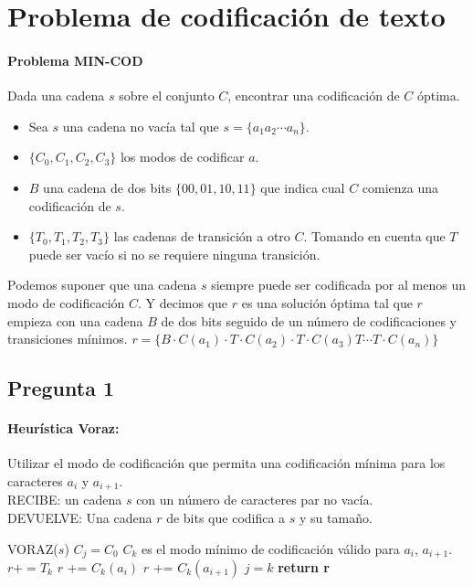 \section{Problema de codificación de texto}

\paragraph{Problema MIN-COD}
Dada una cadena $s$ sobre el conjunto $C$, encontrar una codificación de $C$ óptima.

\begin{itemize}
    \item Sea $s$ una cadena no vacía tal que $s = \{a_1a_2\cdots a_n\}$. 
    \item $\{C_0, C_1, C_2, C_3\}$ los modos de codificar $a$.
    \item $B$ una cadena de dos bits $\{00, 01, 10, 11\}$ que indica cual $C$ comienza una 
    codificación de $s$.
    \item $\{T_0, T_1, T_2, T_3\}$ las cadenas de transición a otro $C$. Tomando en cuenta que 
    $T$ puede ser vacío si no se requiere ninguna transición.
\end{itemize}

Podemos suponer que una cadena $s$ siempre puede ser codificada por al menos un modo de 
codificación $C$. Y decimos que $r$ es una  solución óptima tal que $r$ empieza con una cadena 
$B$ de dos bits seguido de un número de  codificaciones y transiciones mínimos. 
$r=\{B \cdot C(a_1) \cdot T \cdot C(a_2) \cdot T \cdot C(a_3) T \cdots T \cdot C(a_n)\}$

\subsection{Pregunta 1}

\paragraph{Heurística Voraz:}
Utilizar el modo de codificación que permita una codificación mínima para los caracteres 
$a_i$ y $a_{i+1}$.\\

\noindent RECIBE: un cadena $s$ con un número de caracteres par no vacía.\\
DEVUELVE: Una cadena $r$ de bits que codifica a $s$ y su tamaño.

\begin{algorithmic}[1]
\item[]{VORAZ($s$)} 
\State $C_{j} = C_0$ 
    \State $C_k$ es el modo mínimo de codificación válido para $a_i$, $a_{i+1}$.
        \State $r += T_k$
    \EndIf
    \State $r$ += $C_k(a_i)$
    \State $r$ += $C_k(a_{i+1})$
    \State $j = k$
\EndFor
\State \textbf{return r}
\end{algorithmic}

